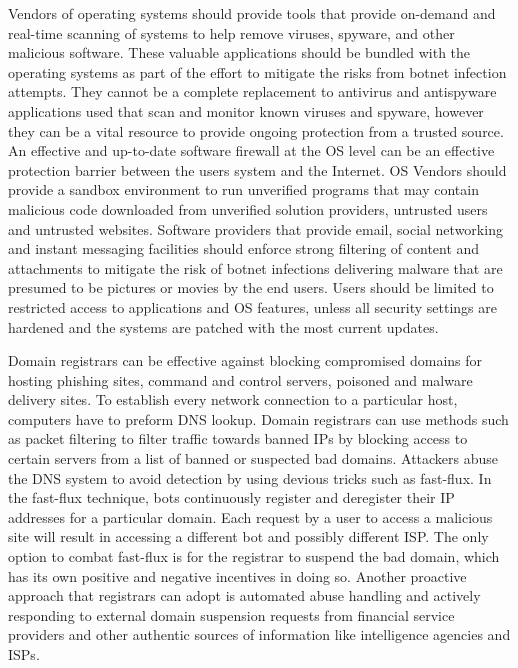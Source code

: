 Vendors of operating systems should provide tools that provide on-demand and real-time scanning of systems to help remove viruses, spyware, and other malicious software. These valuable applications should be bundled with the operating systems as part of the effort to mitigate the risks from botnet infection attempts. They cannot be a complete replacement to antivirus and antispyware applications used that scan and monitor known viruses and spyware, however they can be a vital resource to provide ongoing protection from a trusted source. An effective and up-to-date software firewall at the OS level can be an effective protection barrier between the users system and the Internet. OS Vendors should provide a sandbox environment to run unverified programs that may contain malicious code downloaded from unverified solution providers, untrusted users and untrusted websites. Software providers that provide email, social networking and instant messaging facilities should enforce strong filtering of content and attachments to mitigate the risk of botnet infections delivering malware that are presumed to be pictures or movies by the end users. Users should be limited to restricted access to applications and OS features, unless all security settings are hardened and the systems are patched with the most current updates.	

Domain registrars can be effective against blocking compromised domains for hosting phishing sites, command and control servers, poisoned and malware delivery sites. To establish every network connection to a particular host, computers have to preform DNS lookup. Domain registrars can use methods such as packet filtering to filter traffic towards banned IPs by blocking access to certain servers from a list of banned or suspected bad domains. Attackers abuse the DNS system to avoid detection by using devious tricks such as fast-flux. In the fast-flux technique, bots continuously register and deregister their IP addresses for a particular domain. Each request by a user to access a malicious site will result in accessing a different bot and possibly different ISP. The only option to combat fast-flux is for the registrar to suspend the bad domain, which has its own positive and negative incentives in doing so. Another proactive approach that registrars can adopt is automated abuse handling and actively responding to external domain suspension requests from financial service providers and other authentic sources of information like intelligence agencies and ISPs.

